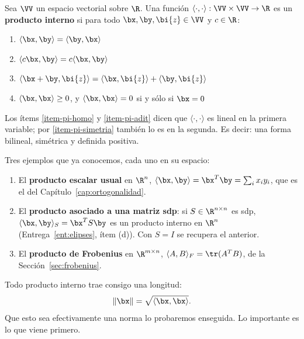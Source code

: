 \begin{definition}
Sea $\VV$ un espacio vectorial sobre $\R$. Una función
$\langle\cdot,\cdot\rangle:\VV\times\VV\to\R$ es un \textbf{producto
interno} si para todo $\bx,\by,\bi{z}\in\VV$ y $c\in\R$:
\begin{enumerate}[label=\textup{(p\arabic*)}]
\item\label{item-pi-simetria} $\langle\bx,\by\rangle=\langle\by,\bx\rangle$
\item\label{item-pi-homo} $\langle c\bx,\by\rangle=c\langle\bx,\by\rangle$
\item\label{item-pi-adit} $\langle\bx+\by,\bi{z}\rangle
  =\langle\bx,\bi{z}\rangle+\langle\by,\bi{z}\rangle$
\item\label{item-pi-conf} $\langle\bx,\bx\rangle\ge0$, y
  $\langle\bx,\bx\rangle=0$ si y sólo si $\bx=0$
\end{enumerate}
\end{definition}

Los ítems \ref{item-pi-homo} y \ref{item-pi-adit} dicen que
$\langle\cdot,\cdot\rangle$ es lineal en la primera variable; por
\ref{item-pi-simetria} también lo es en la segunda. Es decir: una forma
bilineal, simétrica y definida positiva.

\begin{example}\label{ej:productos-internos}
Tres ejemplos que ya conocemos, cada uno en su espacio:
\begin{enumerate}[label=\textup{(\arabic*)},itemsep=2pt]
\item El \textbf{producto escalar usual} en $\R^n$,
$\langle\bx,\by\rangle=\bx^T\by=\sum_i x_iy_i$, que es el del
Capítulo~\ref{cap:ortogonalidad}.
\item El \textbf{producto asociado a una matriz sdp}: si $S\in\R^{n\times n}$
es sdp, $\langle\bx,\by\rangle_S=\bx^TS\by$ es un producto interno en $\R^n$
(Entrega~\ref{ent:elipses}, ítem (d)). Con $S=I$ se recupera el anterior.
\item El \textbf{producto de Frobenius} en $\R^{m\times n}$,
$\langle A,B\rangle_F=\tr(A^TB)$, de la Sección~\ref{sec:frobenius}.
\end{enumerate}
\end{example}

Todo producto interno trae consigo una longitud:
\begin{equation}\label{eq-normaPI}
\|\bx\|=\sqrt{\langle\bx,\bx\rangle} .
\end{equation}
Que esto sea efectivamente una norma lo probaremos enseguida. Lo importante
es lo que viene primero.

